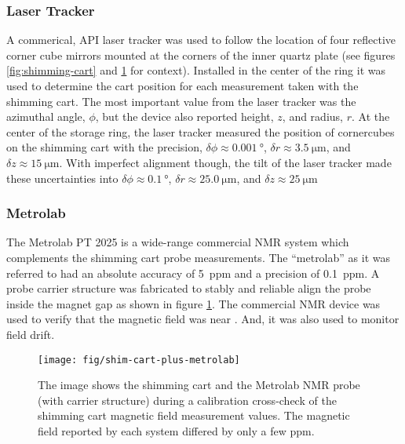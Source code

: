 \subsubsection{Laser Tracker}
A commerical, API laser tracker was used to follow the location of four reflective corner cube mirrors mounted at the corners of the inner quartz plate (see figures \ref{fig:shimming-cart} and \ref{fig:shim-cart-plus-metrolab} for context). Installed in the center of the ring it was used to determine the cart position for each measurement taken with the shimming cart.  The most important value from the laser tracker was the azimuthal angle, $\phi$, but the device also reported height, $z$, and radius, $r$.  At the center of the storage ring, the laser tracker measured the position of cornercubes on the shimming cart with the precision, $\delta\phi \approx \SI{0.001}{\degree}$, $\delta r \approx \SI{3.5}{\micro\meter}$, and $\delta z \approx \SI{15}{\micro\meter}$.  With imperfect alignment though, the tilt of the laser tracker made these uncertainties into $\delta\phi \approx \SI{0.1}{\degree}$, $\delta r \approx \SI{25.0}{\micro\meter}$, and $\delta z \approx \SI{25}{\micro\meter}$

\subsubsection{Metrolab}
The Metrolab PT 2025 is a wide-range commercial NMR system which complements the shimming cart probe measurements.  The ``metrolab'' as it was referred to had an absolute accuracy of \SI{5}{ppm} and a precision of \SI{0.1}{ppm}.  A probe carrier structure was fabricated to stably and reliable align the probe inside the magnet gap as shown in figure \ref{fig:shim-cart-plus-metrolab}.  The commercial NMR device was used to verify that the magnetic field was near \bmagic.  And, it was also used to monitor field drift.

\begin{figure}
\centering
\texttt{[image: fig/shim-cart-plus-metrolab]}
\caption{
    The image shows the shimming cart and the Metrolab NMR probe (with carrier structure) during a calibration cross-check of the shimming cart magnetic field measurement values.  The magnetic field reported by each system differed by only a few ppm.
    \label{fig:shim-cart-plus-metrolab}
}
\end{figure}

